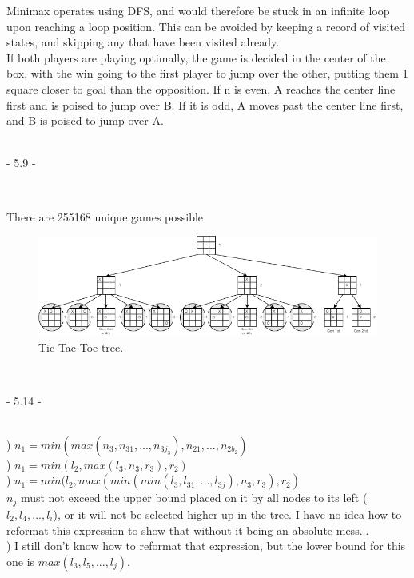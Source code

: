 \documentclass[12pt]{article}
\begin{document}
Minimax operates using DFS, and would therefore be stuck in an infinite loop upon reaching a loop position. This can be avoided by keeping a record of visited states, and skipping any that have been visited already.\\

If both players are playing optimally, the game is decided in the center of the box, with the win going to the first player to jump over the other, putting them 1 square closer to goal than the opposition. If n is even, A reaches the center line first and is poised to jump over B. If it is odd, A moves past the center line first, and B is poised to jump over A.\\


\noindent \hrulefill \\\pagebreak



\centerline{- 5.9 - }
\ \\
\centerline{There are 255168 unique games possible}
\begin{figure}[htbp]
\centerline{\includegraphics[scale=.75]{Pics/ComS472_59.png}}
\caption{Tic-Tac-Toe tree.}
\label{Tic-Tac-Toe tree.}
\end{figure}




\noindent \hrulefill \\



\centerline{- 5.14 - }
\ \\
) $n_1 = min( max(n_3, n_{31}, ..., n_{3j_3}), n_{21}, ..., n_{2b_2}) $\\
) $n_1 = min(l_2,  max(l_3, n_3, r_3), r_2) $\\
) $n_1 = min(l_2,  max(min(min(l_3, l_{31}, ..., l_{3j}),  n_3, r_3), r_2) $\\
$n_j$ must not exceed the upper bound placed on it by all nodes to its left ($l_2, l_4, ..., l_i$), or it will not be selected higher up in the tree. I have no idea how to reformat this expression to show that without it being an absolute mess... \\
) I still don't know how to reformat that expression, but the lower bound for this one is $max(l_3, l_5, ..., l_j)$.\\
\end{document}
